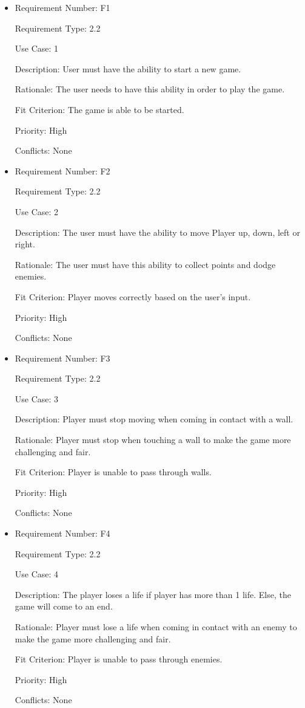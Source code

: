 \documentclass[12pt, titlepage]{article}
\begin{document}
\begin{itemize}
\item
Requirement Number: \hypertarget{f1}{F1}

Requirement Type: 2.2

Use Case: 1

Description: User must have the ability to start a new game.

Rationale: The user needs to have this ability in order to play the game.

Fit Criterion: The game is able to be started.

Priority: High

Conflicts: None
\end{itemize}

\begin{itemize}
\item
Requirement Number: \hypertarget{f2}{F2}

Requirement Type: 2.2

Use Case: 2

Description: The user must have the ability to move Player up, down, left or right.

Rationale: The user must have this ability to collect points and dodge enemies.

Fit Criterion: Player moves correctly based on the user’s input.

Priority: High

Conflicts: None
\end{itemize}

\begin{itemize}
\item
Requirement Number: \hypertarget{f3}{F3}

Requirement Type: 2.2

Use Case: 3

Description: Player must stop moving when coming in contact with a wall.

Rationale: Player must stop when touching a wall to make the game more challenging and fair.

Fit Criterion: Player is unable to pass through walls.

Priority: High

Conflicts: None
\end{itemize}

\begin{itemize}
\item
Requirement Number: \hypertarget{f4}{F4}

Requirement Type: 2.2

Use Case: 4

Description: The player loses a life if player has more than 1 life. Else, the game will come to an end.

Rationale: Player must lose a life when coming in contact with an enemy to make the game more challenging and fair.

Fit Criterion: Player is unable to pass through enemies.

Priority: High

Conflicts: None
\end{itemize}
\end{document}
